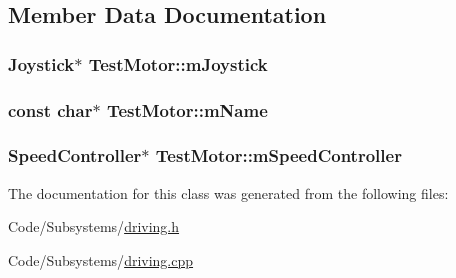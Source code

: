 \subsection{\-Member \-Data \-Documentation}
\hypertarget{class_test_motor_a75510c1fcd2f565c91fe411e7a70feec}{
\subsubsection[{m\-Joystick}]{\setlength{\rightskip}{0pt plus 5cm}\-Joystick$\ast$ {\bf \-Test\-Motor\-::m\-Joystick}}}\label{class_test_motor_a75510c1fcd2f565c91fe411e7a70feec}
\hypertarget{class_test_motor_a3825dab6e71bc4470ea52044f74e052d}{
\subsubsection[{m\-Name}]{\setlength{\rightskip}{0pt plus 5cm}const char$\ast$ {\bf \-Test\-Motor\-::m\-Name}}}\label{class_test_motor_a3825dab6e71bc4470ea52044f74e052d}
\hypertarget{class_test_motor_a1e4141787aa5841e60e06f499b54922d}{
\subsubsection[{m\-Speed\-Controller}]{\setlength{\rightskip}{0pt plus 5cm}\-Speed\-Controller$\ast$ {\bf \-Test\-Motor\-::m\-Speed\-Controller}}}\label{class_test_motor_a1e4141787aa5841e60e06f499b54922d}


\-The documentation for this class was generated from the following files\-:\begin{DoxyCompactItemize}
\item 
\-Code/\-Subsystems/\hyperlink{driving_8h}{driving.\-h}\item 
\-Code/\-Subsystems/\hyperlink{driving_8cpp}{driving.\-cpp}\end{DoxyCompactItemize}
